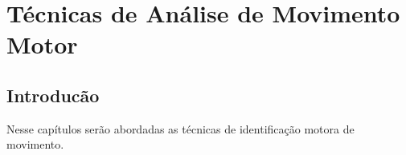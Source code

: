 \chapter{Técnicas de Análise de Movimento Motor} \label{chapter:tecnicasdeclassificacaomotora}

\section{Introducão}
Nesse capítulos serão abordadas as técnicas de identificação motora de movimento. 